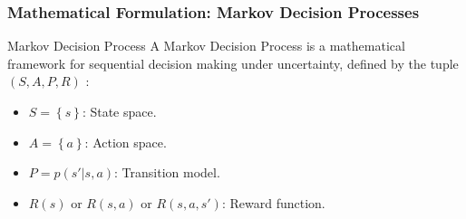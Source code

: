 \begin{frame}
    \frametitle{Mathematical Formulation: Markov Decision Processes}
    \begin{block}{Markov Decision Process}
        A Markov Decision Process is a mathematical framework for sequential
        decision making under uncertainty, defined by the tuple $(S,A,P,R)$ :
        \begin{itemize}
            \item $S=\left \{ s \right \}$: State space.
            \item $A=\left \{ a \right \}$: Action space.
            \item $P=p(s'|s,a)$: Transition model.
            \item $R(s)$ or $R(s,a)$ or $R(s,a,s')$: Reward function.
        \end{itemize}
    \end{block}

    \pause


\end{frame}
